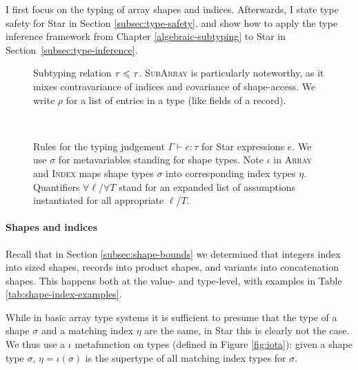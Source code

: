 I first focus on the typing of array shapes and indices.
Afterwards, I state type safety for Star in Section \ref{subsec:type-safety}, and show how to apply the type inference framework from Chapter \ref{algebraic-subtyping} to Star in Section~\ref{subsec:type-inference}.


\begin{figure}[p]
    \centering
    
    \caption{
        Subtyping relation $\tau \leqslant \tau$. \textsc{SubArray} is particularly noteworthy, as it mixes contravariance of indices and covariance of shape-access. 
        We write $\rho$ for a list of entries in a type (like fields of a record). 
    }
    \label{fig:subtyping}
\end{figure}
~
\begin{figure}[p]
    \centering
    
    \caption{Rules for the typing judgement $\Gamma \vdash e : \tau$ for Star expressions $e$. We use $\sigma$ for metavariables standing for shape types.
    Note $\iota$ in \textsc{Array} and \textsc{Index} maps shape types $\sigma$ into corresponding index types $\eta$. 
    Quantifiers $\forall \ell$/$\forall T$ stand for an expanded list of assumptions instantiated for all appropriate $\ell$/$T$.
    }
    \label{fig:typing}
\end{figure}

\paragraph{Shapes and indices}

Recall that in Section \ref{subsec:shape-bounds} we determined that integers index into sized shapes, records into product shapes, and variants into concatenation shapes. This happens both at the value- and type-level, with examples in Table \ref{tab:shape-index-examples}.

While in basic array type systems it is sufficient to presume that the type of a shape $\sigma$ and a matching index $\eta$ are the same, in Star this is clearly not the case. We thus use a $\iota$ metafunction on types (defined in Figure \ref{fig:iota}): given a shape type $\sigma$, $\eta = \iota(\sigma)$ is the supertype of all matching index types for $\sigma$.

